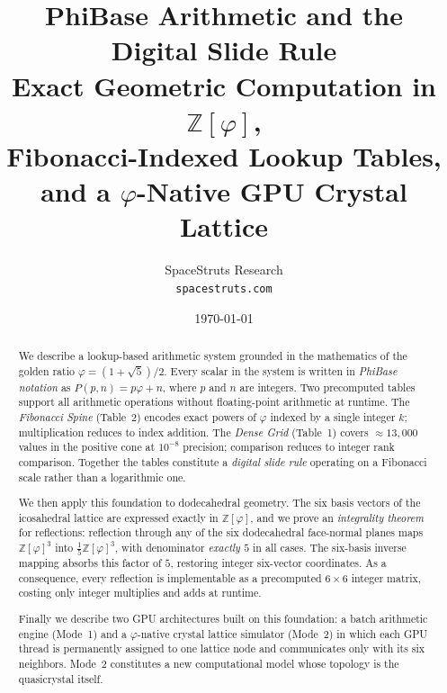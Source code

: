 \documentclass[12pt]{article}
\theoremstyle{definition}
\theoremstyle{remark}
\newcommand{\Zphi}{\mathbb{Z}[\varphi]}
\begin{document}
\title{%
  \textbf{PhiBase Arithmetic and the Digital Slide Rule}\\[6pt]
  \large Exact Geometric Computation in $\mathbb{Z}[\varphi]$,\\
  Fibonacci-Indexed Lookup Tables,\\
  and a $\varphi$-Native GPU Crystal Lattice
}

\author{%
  SpaceStruts Research\\[4pt]
  \small\texttt{spacestruts.com}
}

\date{\today}

\maketitle
\thispagestyle{fancy}

\begin{abstract}
We describe a lookup-based arithmetic system grounded in the mathematics
of the golden ratio $\varphi = (1+\sqrt{5})/2$.  Every scalar in the
system is written in \emph{PhiBase notation} as $P(p,n) = p\varphi + n$,
where $p$ and $n$ are integers.  Two precomputed tables support all
arithmetic operations without floating-point arithmetic at runtime.
The \emph{Fibonacci Spine} (Table~2) encodes exact powers of $\varphi$
indexed by a single integer $k$; multiplication reduces to index addition.
The \emph{Dense Grid} (Table~1) covers $\approx 13{,}000$ values in the
positive cone at $10^{-8}$ precision; comparison reduces to integer rank
comparison.  Together the tables constitute a \emph{digital slide rule}
operating on a Fibonacci scale rather than a logarithmic one.

We then apply this foundation to dodecahedral geometry.  The six
basis vectors of the icosahedral lattice are expressed exactly in
$\Zphi$, and we prove an \emph{integrality theorem} for reflections:
reflection through any of the six dodecahedral face-normal planes maps
$\Zphi^{3}$ into $\tfrac{1}{5}\Zphi^{3}$, with denominator \emph{exactly
$5$} in all cases.  The six-basis inverse mapping absorbs this factor of
$5$, restoring integer six-vector coordinates.  As a consequence, every
reflection is implementable as a precomputed $6\times 6$ integer matrix,
costing only integer multiplies and adds at runtime.

Finally we describe two GPU architectures built on this foundation:
a batch arithmetic engine (Mode~1) and a $\varphi$-native crystal
lattice simulator (Mode~2) in which each GPU thread is permanently
assigned to one lattice node and communicates only with its six neighbors.
Mode~2 constitutes a new computational model whose topology is the
quasicrystal itself.
\end{abstract}
\end{document}
